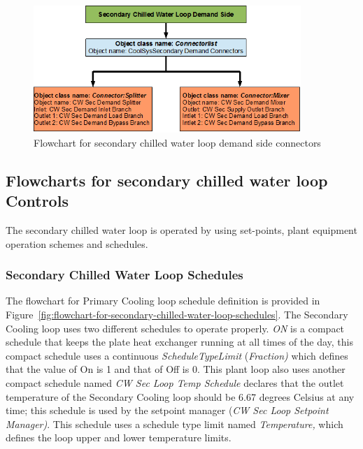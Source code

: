 \begin{figure}[hbtp] %
\centering
\includegraphics[width=0.9\textwidth, height=0.9\textheight, keepaspectratio=true]{media/image111.png}
\caption{Flowchart for secondary chilled water loop demand side connectors \protect \label{fig:flowchart-for-secondary-chilled-water-loop-demand-side-connectors}}
\end{figure}

\subsection{Flowcharts for secondary chilled water loop Controls}\label{flowcharts-for-secondary-chilled-water-loop-controls}

The secondary chilled water loop is operated by using set-points, plant equipment operation schemes and schedules.

\subsubsection{Secondary Chilled Water Loop Schedules}\label{secondary-chilled-water-loop-schedules}

The flowchart for Primary Cooling loop schedule definition is provided in Figure~\ref{fig:flowchart-for-secondary-chilled-water-loop-schedules}. The Secondary Cooling loop uses two different schedules to operate properly. \emph{ON} is a compact schedule that keeps the plate heat exchanger running at all times of the day, this compact schedule uses a continuous \emph{ScheduleTypeLimit} (\emph{Fraction)} which defines that the value of On is 1 and that of Off is 0. This plant loop also uses another compact schedule named \emph{CW Sec Loop Temp Schedule} declares that the outlet temperature of the Secondary Cooling loop should be 6.67 degrees Celsius at any time; this schedule is used by the setpoint manager (\emph{CW Sec Loop Setpoint Manager)}. This schedule uses a schedule type limit named \emph{Temperature,} which defines the loop upper and lower temperature limits.

